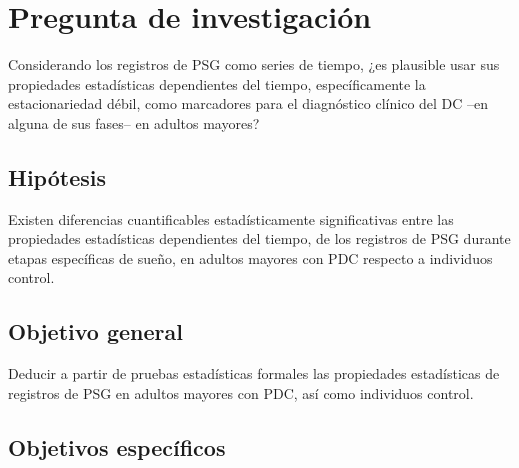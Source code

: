 
\section{Pregunta de investigaci\'on}

Considerando los registros de PSG como series de tiempo,
¿es plausible usar sus propiedades estad\'isticas dependientes del tiempo, espec\'ificamente
la estacionariedad d\'ebil,
como marcadores para el diagn\'ostico cl\'inico del DC --en alguna de 
sus fases-- en adultos mayores?


\subsection{Hip\'otesis}

Existen diferencias cuantificables estad\'isticamente significativas entre las propiedades
estad\'isticas dependientes del tiempo, de los registros de PSG
durante etapas espec\'ificas de sue\~no, en adultos
mayores con PDC respecto a individuos control.


\subsection{Objetivo general}

Deducir a partir de pruebas estad\'isticas formales las propiedades
estad\'isticas de registros de PSG en adultos mayores con PDC, as\'i como individuos control.


\subsection{Objetivos espec\'ificos}

